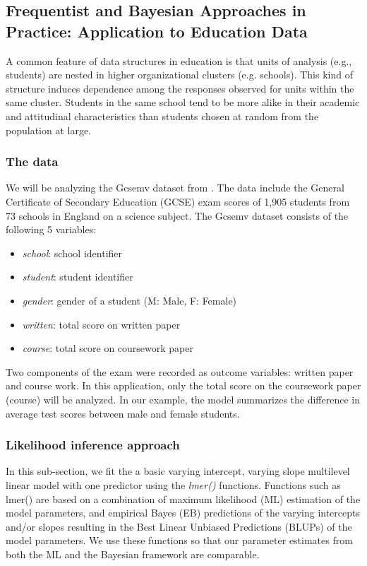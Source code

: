 \subsection{Frequentist and Bayesian Approaches in Practice: Application to Education Data}

A common feature of data structures in education is that units of analysis (e.g., students) are nested in higher organizational clusters (e.g. schools). This kind of structure induces dependence among the responses observed for units within the same cluster. Students in the same school tend to be more alike in their academic and attitudinal characteristics than students chosen at random from the population at large.

\subsubsection{The data}
We will be analyzing the Gcsemv dataset from \cite{rasbash2000user}. The data include the General Certificate of Secondary Education (GCSE) exam scores of 1,905 students from 73 schools in England on a science subject. The Gcsemv dataset consists of the following 5 variables:
\begin{itemize}
	\item \textit{school}: school identifier
	\item \textit{student}: student identifier
	\item \textit{gender}: gender of a student (M: Male, F: Female)
	\item \textit{written}: total score on written paper
	\item \textit{course}: total score on coursework paper
\end{itemize}
Two components of the exam were recorded as outcome variables: written paper and course work. In this application, only the total score on the coursework paper (course) will be analyzed. In our example, the model summarizes the difference in average test scores between male and female students.

\subsubsection{Likelihood inference approach}
In this sub-section, we fit the a basic varying intercept, varying slope multilevel linear model with one predictor using the \textit{lmer()} functions. Functions such as lmer() are based on a combination of maximum likelihood (ML) estimation of the model parameters, and empirical Bayes (EB) predictions of the varying intercepts and/or slopes resulting in the Best Linear Unbiased Predictions (BLUPs) of the model parameters. We use these functions so that our parameter estimates from both the ML and the Bayesian framework are comparable.

